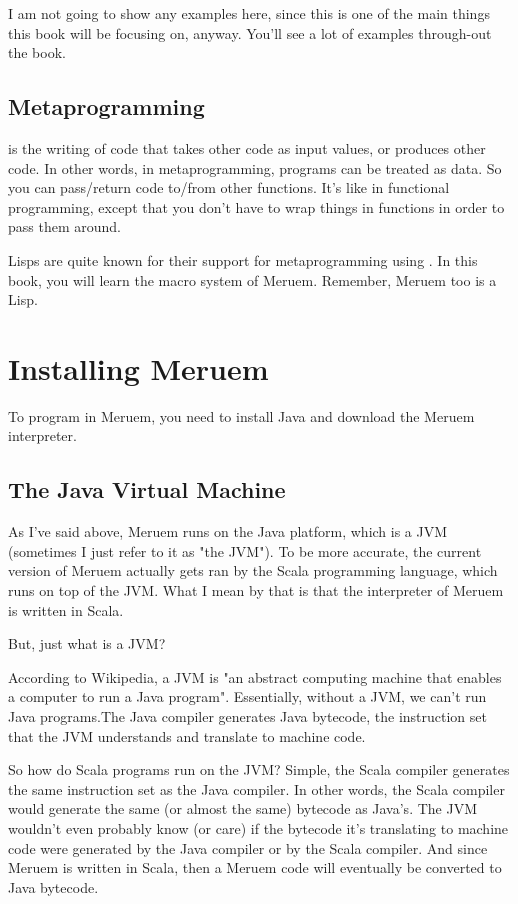 I am not going to show any examples here, since this is one of the main things this book will be focusing on, anyway. You'll see a lot of examples through-out the book.

\subsection{Metaprogramming}
 is the writing of code that takes other code as input values, or produces other code. In other words, in metaprogramming, programs can be treated as data. So you can pass/return code to/from other functions. It's like in functional programming, except that you don't have to wrap things in functions in order to pass them around. 

Lisps are quite known for their support for metaprogramming using . In this book, you will learn the macro system of Meruem. Remember, Meruem too is a Lisp.  

\section{Installing Meruem}
\label{sec:installing-meruem}
To program in Meruem, you need to install Java and download the Meruem interpreter.

\subsection{The Java Virtual Machine}
As I've said above, Meruem runs on the Java platform, which is a JVM (sometimes I just refer to it as "the JVM"). To be more accurate, the current version of Meruem actually gets ran by the Scala programming language, which runs on top of the JVM. What I mean by that is that the interpreter of Meruem is written in Scala. 

But, just what is a JVM? 

According to Wikipedia, a JVM is "an abstract computing machine that enables a computer to run a Java program". Essentially, without a JVM, we can't run Java programs.The Java compiler generates Java bytecode, the instruction set that the JVM understands and translate to machine code.

So how do Scala programs run on the JVM? Simple, the Scala compiler generates the same instruction set as the Java compiler. In other words, the Scala compiler would generate the same (or almost the same) bytecode as Java's. The JVM wouldn't even probably know (or care) if the bytecode it's translating to machine code were generated by the Java compiler or by the Scala compiler. And since Meruem is written in Scala, then a Meruem code will eventually be converted to Java bytecode. 

